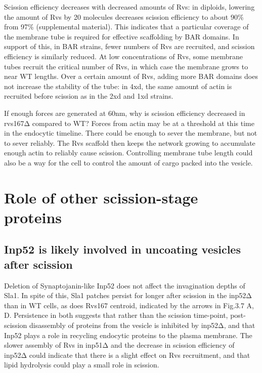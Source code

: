 {Scission efficiency decreases with decreased amounts of Rvs: in diploids, lowering the amount of Rvs by 20 molecules decreases scission efficiency to about 90\% from 97\% (supplemental material). This indicates that a particular coverage of the membrane tube is required for effective scaffolding by BAR domains. In support of this, in BAR strains, fewer numbers of Rvs are recruited, and scission efficiency is similarly reduced. At low concentrations of Rvs, some membrane tubes recruit the critical number of Rvs, in which case the membrane grows to near WT lengths. Over a certain amount of Rvs, adding more BAR domains does not increase the stability of the tube: in 4xd, the same amount of actin is recruited before scission as in the 2xd and 1xd strains. 

If enough forces are generated at 60nm, why is scission efficiency decreased in rvs167Δ compared to WT? 
Forces from actin may be at a threshold at this time in the endocytic timeline. There could be enough to sever the membrane, but not to sever reliably. The Rvs scaffold then keeps the network growing to accumulate enough actin to reliably cause scission. Controlling membrane tube length could also be a way for the cell to control the amount of cargo packed into the vesicle. 





\section{Role of other scission-stage proteins}
\subsection{Inp52 is likely involved in uncoating vesicles after scission}
Deletion of Synaptojanin-like Inp52 does not affect the invagination depths of Sla1. In spite of this, Sla1 patches persist for longer after scission in the inp52Δ than in WT cells, as does Rvs167 centroid, indicated by the arrows in Fig.3.7 A, D. Persistence in both suggests that rather than the scission time-point, post- scission disassembly of proteins from the vesicle is inhibited by inp52Δ, and that Inp52 plays a role in recycling endocytic proteins to the plasma membrane. The slower assembly of Rvs in inp51Δ and the decrease in scission efficiency of inp52Δ could indicate that there is a slight effect on Rvs recruitment, and that lipid hydrolysis could play a small role in scission. 


}
